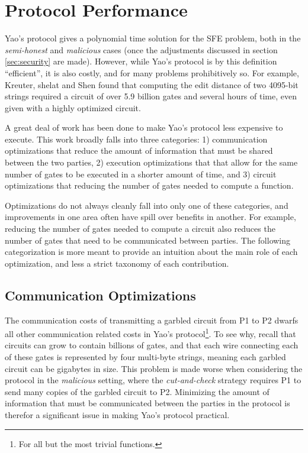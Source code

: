 \section{Protocol Performance}
\label{sec:performance}

Yao's protocol gives a polynomial time solution for the \ac{SFE} problem, both in the \emph{semi-honest} and \emph{malicious} cases (once the adjustments discussed in section \ref{sec:security} are made).  However, while Yao's protocol is by this definition ``efficient'', it is also costly, and for many problems prohibitively so.  For example, Kreuter, shelat and Shen\cite{kreuter2012billion} found that computing the edit distance of two 4095-bit strings required a circuit of over 5.9 billion gates and several hours of time, even given with a highly optimized circuit.

A great deal of work has been done to make Yao's protocol less expensive to execute.  This work broadly falls into three categories: 1) communication optimizations that reduce the amount of information that must be shared between the two parties, 2) execution optimizations that that allow for the same number of gates to be executed in a shorter amount of time, and 3) circuit optimizations that reducing the number of gates needed to compute a function.

Optimizations do not always cleanly fall into only one of these categories, and improvements in one area often have spill over benefits in another.  For example, reducing the number of gates needed to compute a circuit also reduces the number of gates that need to be communicated between parties.  The following categorization is more meant to provide an intuition about the main role of each optimization, and less a strict taxonomy of each contribution.


\subsection{Communication Optimizations}

The communication costs of transmitting a garbled circuit from \ac{P1} to \ac{P2} dwarfs all other communication related costs in Yao's protocol\footnote{For all but the most trivial functions.}.  To see why, recall that circuits can grow to contain billions of gates, and that each wire connecting each of these gates is represented by four multi-byte strings, meaning each garbled circuit can be gigabytes in size. This problem is made worse when considering the protocol in the \emph{malicious} setting, where the \emph{cut-and-check} strategy requires \ac{P1} to send many copies of the garbled circuit to \ac{P2}. Minimizing the amount of information that must be communicated between the parties in the protocol is therefor a significant issue in making Yao's protocol practical.

